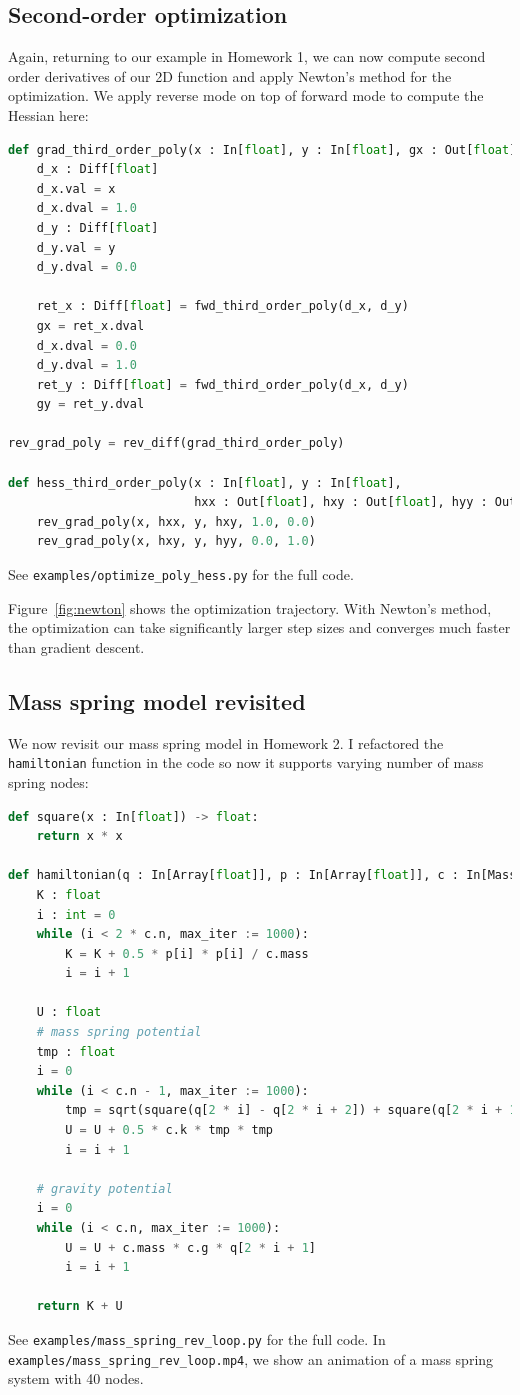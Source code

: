 \subsection{Second-order optimization}
Again, returning to our example in Homework 1, we can now compute second order derivatives of our 2D function and apply Newton's method for the optimization. We apply reverse mode on top of forward mode to compute the Hessian here:
\begin{lstlisting}[language=Python]
def grad_third_order_poly(x : In[float], y : In[float], gx : Out[float], gy : Out[float]):
    d_x : Diff[float]
    d_x.val = x
    d_x.dval = 1.0
    d_y : Diff[float]
    d_y.val = y
    d_y.dval = 0.0

    ret_x : Diff[float] = fwd_third_order_poly(d_x, d_y)
    gx = ret_x.dval
    d_x.dval = 0.0
    d_y.dval = 1.0
    ret_y : Diff[float] = fwd_third_order_poly(d_x, d_y)
    gy = ret_y.dval

rev_grad_poly = rev_diff(grad_third_order_poly)

def hess_third_order_poly(x : In[float], y : In[float],
                          hxx : Out[float], hxy : Out[float], hyy : Out[float]):
    rev_grad_poly(x, hxx, y, hxy, 1.0, 0.0)
    rev_grad_poly(x, hxy, y, hyy, 0.0, 1.0)
\end{lstlisting}
See \lstinline{examples/optimize_poly_hess.py} for the full code.

Figure~\ref{fig:newton} shows the optimization trajectory. With Newton's method, the optimization can take significantly larger step sizes and converges much faster than gradient descent.

\subsection{Mass spring model revisited}
We now revisit our mass spring model in Homework 2. I refactored the \lstinline{hamiltonian} function in the code so now it supports varying number of mass spring nodes:
\begin{lstlisting}[language=Python]
def square(x : In[float]) -> float:
    return x * x

def hamiltonian(q : In[Array[float]], p : In[Array[float]], c : In[MassSpringConfig]) -> float:
    K : float
    i : int = 0
    while (i < 2 * c.n, max_iter := 1000):
        K = K + 0.5 * p[i] * p[i] / c.mass
        i = i + 1

    U : float
    # mass spring potential
    tmp : float
    i = 0
    while (i < c.n - 1, max_iter := 1000):
        tmp = sqrt(square(q[2 * i] - q[2 * i + 2]) + square(q[2 * i + 1] - q[2 * i + 3])) - c.length
        U = U + 0.5 * c.k * tmp * tmp
        i = i + 1

    # gravity potential
    i = 0
    while (i < c.n, max_iter := 1000):
        U = U + c.mass * c.g * q[2 * i + 1]
        i = i + 1

    return K + U
\end{lstlisting}
See \lstinline{examples/mass_spring_rev_loop.py} for the full code. In \lstinline{examples/mass_spring_rev_loop.mp4}, we show an animation of a mass spring system with 40 nodes.


